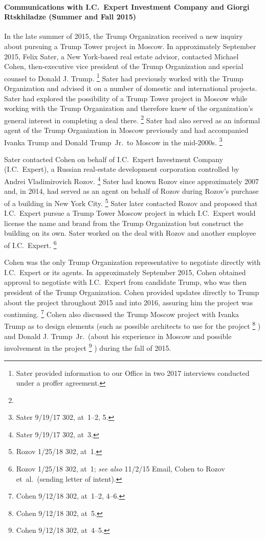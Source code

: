 \paragraph{Communications with I.C.~Expert Investment Company and Giorgi Rtskhiladze (Summer and Fall 2015)}

In the late summer of 2015, the Trump Organization received a new inquiry about pursuing a Trump Tower project in Moscow.
In approximately September 2015, Felix Sater, a New York-based real estate advisor, contacted Michael Cohen, then-executive vice president of the Trump Organization and special counsel to Donald J. Trump.%
\footnote{Sater provided information to our Office in two 2017 interviews conducted under a proffer agreement.
}
Sater had previously worked with the Trump Organization and advised it on a number of domestic and international projects.
Sater had explored the possibility of a Trump Tower project in Moscow while working with the Trump Organization and therefore knew of the organization's general interest in completing a deal there.%
\footnote{}
Sater had also served as an informal agent of the Trump Organization in Moscow previously and had accompanied Ivanka Trump and Donald Trump~Jr.\ to Moscow in the mid-2000s.%
\footnote{Sater 9/19/17 302, at~1--2, 5.}

Sater contacted Cohen on behalf of I.C.~Expert Investment Company (I.C.~Expert), a Russian real-estate development corporation controlled by Andrei Vladimirovich Rozov.%
\footnote{Sater 9/19/17 302, at~3.}
Sater had known Rozov since approximately 2007 and, in 2014, had served as an agent on behalf of Rozov during Rozov's purchase of a building in New York City.%
\footnote{Rozov 1/25/18 302, at~1.}
Sater later contacted Rozov and proposed that I.C.~Expert pursue a Trump Tower Moscow project in which I.C.~Expert would license the name and brand from the Trump Organization but construct the building on its own.
Sater worked on the deal with Rozov and another employee of I.C.~Expert.%
\footnote{Rozov 1/25/18 302, at~1;
\textit{see also} 11/2/15 Email, Cohen to Rozov et~al.\ (sending letter of intent).}

Cohen was the only Trump Organization representative to negotiate directly with I.C.~Expert or its agents.
In approximately September 2015, Cohen obtained approval to negotiate with I.C.~Expert from candidate Trump, who was then president of the Trump Organization.
Cohen provided updates directly to Trump about the project throughout 2015 and into 2016, assuring him the project was continuing.%
\footnote{Cohen 9/12/18 302, at~1--2, 4--6.}
Cohen also discussed the Trump Moscow project with Ivanka Trump as to design elements (such as possible architects to use for the project%
\footnote{Cohen 9/12/18 302, at~5.}%
) and Donald J. Trump~Jr.\ (about his experience in Moscow and possible involvement in the project%
\footnote{Cohen 9/12/18 302, at~4--5.}%
) during the fall of 2015.

